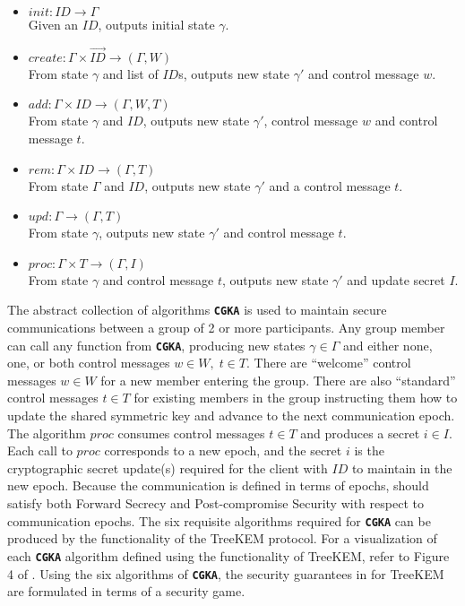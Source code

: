 \begin{itemize}
\item
  \(init : ID \to \Gamma\)\\
  Given an \(ID\), outputs initial state \(\gamma\).
\item
  \(create : \Gamma \times \overrightarrow{ID} \to (\Gamma, W)\)\\
  From state \(\gamma\) and list of \(ID\)s, outputs new state \(\gamma'\) and control message \(w\).
\item
  \(add : \Gamma \times ID \to (\Gamma, W, T)\)\\
  From state \(\gamma\) and \(ID\), outputs new state \(\gamma'\), control message \(w\) and control message \(t\).
\item
  \(rem : \Gamma \times ID \to (\Gamma, T)\)\\
  From state \(\Gamma\) and \(ID\), outputs new state \(\gamma'\) and a control message \(t\).
\item
  \(upd : \Gamma \to (\Gamma, T)\)\\
  From state \(\gamma\), outputs new state \(\gamma'\) and control message \(t\).
\item
  \(proc : \Gamma \times T \to (\Gamma, I)\)\\
  From state \(\gamma\) and control message \(t\), outputs new state \(\gamma'\) and update secret \(I\).
\end{itemize}

The abstract collection of algorithms \textbf{\texttt{CGKA}} is used to maintain secure communications between a group of 2 or more participants.
Any group member can call any function from \textbf{\texttt{CGKA}}, producing new states \(\gamma \in \Gamma\) and either none, one, or both control messages \(w \in W,\; t \in T\).
There are ``welcome'' control messages \(w \in W\) for a new member entering the group.
There are also ``standard'' control messages \(t \in T\) for existing members in the group instructing them how to update the shared symmetric key and advance to the next communication epoch.
The algorithm \(proc\) consumes control messages \(t \in T\) and produces a secret \(i \in I\).
Each call to \(proc\) corresponds to a new epoch, and the secret \(i\) is the cryptographic secret update(s) required for the client with \(ID\) to maintain  in the new epoch.
Because the communication is defined in terms of epochs,  should satisfy both Forward Secrecy and Post-compromise Security with respect to communication epochs.
The six requisite algorithms required for \textbf{\texttt{CGKA}} can be produced by the functionality of the TreeKEM protocol.
For a visualization of each \textbf{\texttt{CGKA}} algorithm defined using the functionality of TreeKEM, refer to Figure 4 of \autocite{alwen2020security}.
Using the six algorithms of \textbf{\texttt{CGKA}}, the security guarantees in for TreeKEM are formulated in terms of a security game.

